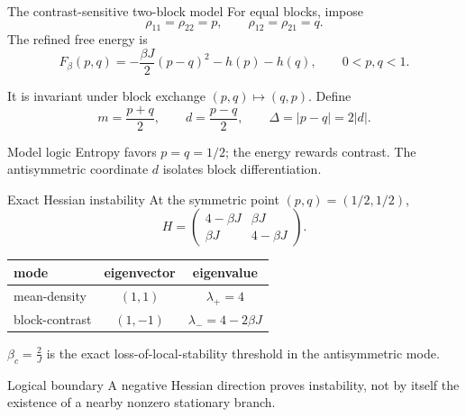 \begin{frame}{The contrast-sensitive two-block model}
  For equal blocks, impose
  \[
    \rho_{11}=\rho_{22}=p,
    \qquad
    \rho_{12}=\rho_{21}=q.
  \]
  The refined free energy is
  \[
    \boxed{F_\beta(p,q)
      =-\frac{\beta J}{2}(p-q)^2-h(p)-h(q),
      \qquad 0<p,q<1.}
  \]

  It is invariant under block exchange $(p,q)\mapsto(q,p)$. Define
  \[
    m=\frac{p+q}{2},
    \qquad d=\frac{p-q}{2},
    \qquad \Delta=|p-q|=2|d|.
  \]

  \begin{block}{Model logic}
    Entropy favors $p=q=1/2$; the energy rewards contrast. The antisymmetric
    coordinate $d$ isolates block differentiation.
  \end{block}
\end{frame}

\begin{frame}{Exact Hessian instability}
  \small
  At the symmetric point $(p,q)=(1/2,1/2)$,
  \[
    H=
    \begin{pmatrix}
      4-\beta J & \beta J\\
      \beta J & 4-\beta J
    \end{pmatrix}.
  \]

  \begin{center}
    \begin{tabular}{lcc}
      \toprule
      mode & eigenvector & eigenvalue \\
      \midrule
      mean-density & $(1,1)$ & $\lambda_{+}=4$ \\
      block-contrast & $(1,-1)$ & $\lambda_{-}=4-2\beta J$ \\
      \bottomrule
    \end{tabular}
  \end{center}

  \begin{center}
    \alert{$\displaystyle \beta_c=\frac{2}{J}$} is the exact
    loss-of-local-stability threshold in the antisymmetric mode.
  \end{center}

  \begin{alertblock}{Logical boundary}
    A negative Hessian direction proves instability, not by itself the
    existence of a nearby nonzero stationary branch.
  \end{alertblock}
\end{frame}


